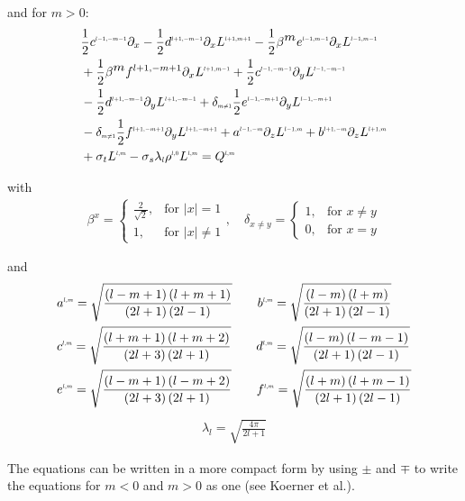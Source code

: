 and for $m>0$:
\begin{align}
&
\frac{1}{2}c^{\scaleto{l-1,-m-1}{4pt}}\partial_x 
-\frac{1}{2}d^{\scaleto{l+1,-m-1}{4pt}}\partial_x L^{\scaleto{l+1,m+1}{4pt}}
-\frac{1}{2}\beta^{\scaleto{m}{4pt}}e^{\scaleto{l-1,m-1}{4pt}}\partial_x L^{\scaleto{l-1,m-1}{4pt}}
\nonumber
\\&
+\frac{1}{2}\beta^{\scaleto{m}{4pt}}f^{l+1,-m+1}\partial_x L^{\scaleto{l+1,m-1}{4pt}}
+\frac{1}{2}c^{\scaleto{l-1,-m-1}{4pt}}\partial_y L^{\scaleto{l-1,-m-1}{4pt}}
\nonumber
\\&
-\frac{1}{2}d^{\scaleto{l+1,-m-1}{4pt}}\partial_y L^{\scaleto{l+1,-m-1}{4pt}}
+\delta_{\scaleto{m\neq 1}{4pt}}\frac{1}{2}e^{\scaleto{l-1,-m+1}{4pt}}\partial_y L^{\scaleto{l-1,-m+1}{4pt}}
\nonumber
\\&
-\delta_{\scaleto{m\neq 1}{4pt}}\frac{1}{2}f^{\scaleto{l+1,-m+1}{4pt}}\partial_y L^{\scaleto{l+1,-m+1}{4pt}}
+a^{\scaleto{l-1,-m}{4pt}}\partial_z L^{\scaleto{l-1,m}{4pt}}
+b^{\scaleto{l+1,-m}{4pt}}\partial_z L^{\scaleto{l+1,m}{4pt}}
\nonumber
\\&
+\sigma_t L^{\scaleto{l,m}{4pt}}
-\sigma_s\lambda_{\scaleto{l}{4pt}}\phase^{\scaleto{l,0}{4pt}}L^{\scaleto{l,m}{4pt}}
= Q^{\scaleto{l,m}{4pt}}
\end{align}



with
\begin{align*}
\beta^{x}=
\left\{
\begin{array}{ll}
\frac{2}{\sqrt{2}}, & \text{for } \vert x\vert = 1\\
1, & \text{for } \vert x\vert \neq 1
\end{array}
\right.
,\quad
\delta_{x\neq y}=
\left\{
\begin{array}{ll}
1, & \text{for } x \neq y\\
0, & \text{for } x = y
\end{array}
\right.
\end{align*}

and
\begin{align*}
&
a^{\scaleto{l,m}{4pt}}= \sqrt{\frac{\left(l-m+1\right)\left(l+m+1\right)}{\left(2l+1\right)\left(2l-1\right)}} \qquad
b^{\scaleto{l,m}{4pt}}= \sqrt{\frac{\left(l-m\right)\left(l+m\right)}{\left(2l+1\right)\left(2l-1\right)}}
\\&
c^{\scaleto{l,m}{4pt}}= \sqrt{\frac{\left(l+m+1\right)\left(l+m+2\right)}{\left(2l+3\right)\left(2l+1\right)}} \qquad
d^{\scaleto{l,m}{4pt}}= \sqrt{\frac{\left(l-m\right)\left(l-m-1\right)}{\left(2l+1\right)\left(2l-1\right)}}
\\&
e^{\scaleto{l,m}{4pt}}= \sqrt{\frac{\left(l-m+1\right)\left(l-m+2\right)}{\left(2l+3\right)\left(2l+1\right)}} \qquad
f^{\scaleto{l,m}{4pt}}= \sqrt{\frac{\left(l+m\right)\left(l+m-1\right)}{\left(2l+1\right)\left(2l-1\right)}}
\end{align*}
\begin{align*}
\lambda_l=\sqrt{\frac{4\pi}{2l+1}}
\end{align*}

The equations can be written in a more compact form by using $\pm$ and $\mp$ to write the equations for $m<0$ and $m>0$ as one (see Koerner et al.\cite{Koerner14}).
